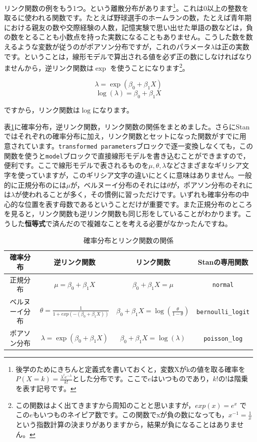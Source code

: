 \documentclass{ltjsbook}
\begin{document}
リンク関数の例をもう1つ。という離散分布があります\footnote{後学のためにきちんと定義式を書いておくと，変数Xがkの値を取る確率を$P(X=k)=\frac{\lambda^l e^{-\lambda}}{k!}$とした分布です。ここで$e$はいつものであり，$k!$の$!$は階乗を表す記号です。}。これは0以上の整数を取るに使われる関数です。たとえば野球選手のホームランの数，たとえば青年期における親友の数や交際経験の人数，記憶実験で思い出せた単語の数などは，負の数をとることも小数点を持った実数になることもありません。こうした数を数えるような変数が従うのがポアソン分布ですが，これのパラメータ$\lambda$は正の実数です。ということは，線形モデルで算出される値を必ず正の数にしなければなりませんから，逆リンク関数は$\exp$ を使うことになります\footnote{この関数はよく出てきますから周知のことと思いますが，$exp(x)=e^x$ でこの$e$もいつものネイピア数です。この関数でxが負の数になっても，$x^{-1}=\frac{1}{x}$という指数計算の決まりがありますから，結果が負になることはありません。}。

\[ \lambda = \exp(\beta_0 + \beta_1 X) \]
\[ \log(\lambda) = \beta_0 + \beta_1X \]

ですから，リンク関数は$\log$になります。

表\ref{tbl::25_01}に確率分布，逆リンク関数，リンク関数の関係をまとめました。さらにStanではそれぞれの確率分布に加え，リンク関数とセットになった関数がすでに用意されています。\verb|transformed parameters|ブロックで逐一変換しなくても，この関数を使うと\verb|model|ブロックで直接線形モデルを書き込むことができますので，便利です。ここで線形モデルで表されるものを$\mu,\theta,\lambda$などさまざまなギリシア文字を使っていますが，このギリシア文字の違いにとくに意味はありません。一般的に正規分布のには$\mu$が，ベルヌーイ分布のそれには$\theta$が，ポアソン分布のそれには$\lambda$が使われることが多く，その慣例に習っただけです。いずれも確率分布の中心的な位置を表す母数であるということだけが重要です。また正規分布のところを見ると，リンク関数も逆リンク関数も同じ形をしていることがわかります。こうした\textbf{恒等式}で済んだので複雑なことを考える必要がなかったんですね。

\begin{table}[ht]
	\centering
	\caption{確率分布とリンク関数の関係}
	\begin{tabular}{cccc}
		確率分布    & 逆リンク関数                                          & リンク関数                                                             & Stanの専用関数              \\\hline
		正規分布    & $\mu = \beta_0 + \beta_1 X$                     & $\beta_0 + \beta_1X=\mu$                                          & \verb|normal|          \\
		ベルヌーイ分布 & $\theta = \frac{1}{1+exp(-(\beta_0+\beta_1X))}$ & $\beta_0 + \beta_1 X = \log\left(\frac{\theta}{1-\theta}\right) $ & \verb|bernoulli_logit| \\
		ポアソン分布  & $\lambda = \exp(\beta_0 + \beta_1 X)$           & $\beta_0 + \beta_1X = \log(\lambda)$                              & \verb|poisson_log|     \\\hline
	\end{tabular}
	\label{tbl::25_01}
\end{table}
\end{document}
